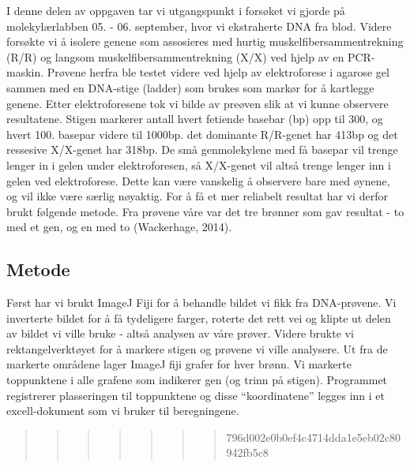 \documentclass[
  letterpaper,
  DIV=11,
  numbers=noendperiod]{scrreprt}
\begin{document}
I denne delen av oppgaven tar vi utgangspunkt i forsøket vi gjorde på
molekylærlabben 05. - 06. september, hvor vi ekstraherte DNA fra blod.
Videre forsøkte vi å isolere genene som assosieres med hurtig
muskelfibersammentrekning (R/R) og langsom muskelfibersammentrekning
(X/X) ved hjelp av en PCR-maskin. Prøvene herfra ble testet videre ved
hjelp av elektroforese i agarose gel sammen med en DNA-stige (ladder)
som brukes som markør for å kartlegge genene. Etter elektroforesene tok
vi bilde av preøven slik at vi kunne observere resultatene. Stigen
markerer antall hvert fetiende basebar (bp) opp til 300, og hvert 100.
basepar videre til 1000bp. det dominante R/R-genet har 413bp og det
ressesive X/X-genet har 318bp. De små genmolekylene med få basepar vil
trenge lenger in i gelen under elektroforesen, så X/X-genet vil altså
trenge lenger inn i gelen ved elektroforese. Dette kan være vanskelig å
observere bare med øynene, og vil ikke være særlig nøyaktig. For å få et
mer reliabelt resultat har vi derfor brukt følgende metode. Fra prøvene
våre var det tre brønner som gav resultat - to med et gen, og en med to
(Wackerhage, 2014).

\subsection{Metode}\label{metode-2}

Først har vi brukt ImageJ Fiji for å behandle bildet vi fikk fra
DNA-prøvene. Vi inverterte bildet for å få tydeligere farger, roterte
det rett vei og klipte ut delen av bildet vi ville bruke - altså
analysen av våre prøver. Videre brukte vi rektangelverktøyet for å
markere stigen og prøvene vi ville analysere. Ut fra de markerte
områdene lager ImageJ fiji grafer for hver brønn. Vi markerte
toppunktene i alle grafene som indikerer gen (og trinn på stigen).
Programmet registrerer plasseringen til toppunktene og disse
``koordinatene'' legges inn i et excell-dokument som vi bruker til
beregningene.

\begin{quote}
\begin{quote}
\begin{quote}
\begin{quote}
\begin{quote}
\begin{quote}
\begin{quote}
796d002e0b0ef4c4714dda1e5eb02c80942fb5c8
\end{quote}
\end{quote}
\end{quote}
\end{quote}
\end{quote}
\end{quote}
\end{quote}
\end{document}
